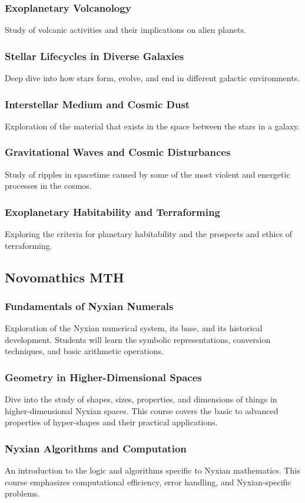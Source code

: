 \subsubsection{Exoplanetary Volcanology}
Study of volcanic activities and their implications on alien planets.
\subsubsection{Stellar Lifecycles in Diverse Galaxies}
Deep dive into how stars form, evolve, and end in different galactic environments.
\subsubsection{Interstellar Medium and Cosmic Dust}
Exploration of the material that exists in the space between the stars in a galaxy.
\subsubsection{Gravitational Waves and Cosmic Disturbances}
Study of ripples in spacetime caused by some of the most violent and energetic processes in the cosmos.
\subsubsection{Exoplanetary Habitability and Terraforming}
Exploring the criteria for planetary habitability and the prospects and ethics of terraforming.


\subsection{Novomathics \hfill MTH}
\subsubsection{Fundamentals of Nyxian Numerals}
Exploration of the Nyxian numerical system, its base, and its historical development. Students will learn the symbolic representations, conversion techniques, and basic arithmetic operations.
\subsubsection{Geometry in Higher-Dimensional Spaces}
Dive into the study of shapes, sizes, properties, and dimensions of things in higher-dimensional Nyxian spaces. This course covers the basic to advanced properties of hyper-shapes and their practical applications.
\subsubsection{Nyxian Algorithms and Computation}
An introduction to the logic and algorithms specific to Nyxian mathematics. This course emphasizes computational efficiency, error handling, and Nyxian-specific problems.
